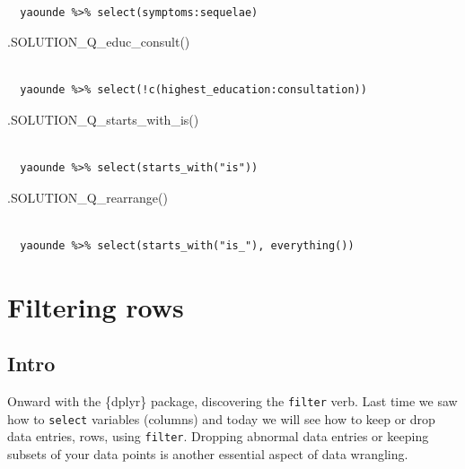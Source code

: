 \documentclass[
  letterpaper,
  DIV=11,
  numbers=noendperiod]{scrreprt}
\newenvironment{Shaded}{\begin{snugshade}}{\end{snugshade}}
\newcommand{\FunctionTok}[1]{\textcolor[rgb]{0.28,0.35,0.67}{#1}}
\newcommand{\NormalTok}[1]{\textcolor[rgb]{0.00,0.23,0.31}{#1}}
\begin{document}
\begin{verbatim}
 
  yaounde %>% select(symptoms:sequelae)
\end{verbatim}

\begin{Shaded}
\begin{Highlighting}[]
\FunctionTok{.SOLUTION\_Q\_educ\_consult}\NormalTok{()}
\end{Highlighting}
\end{Shaded}

\begin{verbatim}
 
  yaounde %>% select(!c(highest_education:consultation))
\end{verbatim}

\begin{Shaded}
\begin{Highlighting}[]
\FunctionTok{.SOLUTION\_Q\_starts\_with\_is}\NormalTok{()}
\end{Highlighting}
\end{Shaded}

\begin{verbatim}
 
  yaounde %>% select(starts_with("is"))
\end{verbatim}

\begin{Shaded}
\begin{Highlighting}[]
\FunctionTok{.SOLUTION\_Q\_rearrange}\NormalTok{()}
\end{Highlighting}
\end{Shaded}

\begin{verbatim}
 
  yaounde %>% select(starts_with("is_"), everything())
\end{verbatim}

\chapter{Filtering rows}\label{filtering-rows}

\section{Intro}\label{intro}

Onward with the \{dplyr\} package, discovering the \texttt{filter} verb.
Last time we saw how to \texttt{select} variables (columns) and today we
will see how to keep or drop data entries, rows, using \texttt{filter}.
Dropping abnormal data entries or keeping subsets of your data points is
another essential aspect of data wrangling.
\end{document}
